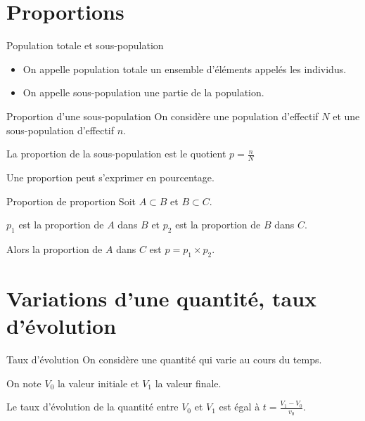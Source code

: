 \begin{pageCours} %


\section{Proportions}

\begin{DefT}{Population totale et sous-population}
\begin{itemize}
\item On appelle population totale un ensemble d'éléments appelés les individus.
\item On appelle sous-population une partie de la population.
\end{itemize}
\end{DefT}

\begin{DefT}{Proportion d'une sous-population}
On considère une population d'effectif $N$ et une sous-population d'effectif $n$.

La proportion de la sous-population est le quotient $p=\frac{n}{N}$
\end{DefT}

\begin{Rq}
Une proportion peut s'exprimer en pourcentage.
\end{Rq}

\begin{PpT}{Proportion de proportion}
Soit $A\subset B$ et $B\subset C$.

$p_1$ est la proportion de $A$ dans $B$ et $p_2$ est la proportion de $B$ dans $C$. 

Alors la proportion de $A$ dans $C$ est $p=p_1\times p_2$.
\end{PpT}

\section{Variations d'une quantité, taux d'évolution}

\begin{DefT}{Taux d'évolution}
On considère une quantité qui varie au cours du temps.

On note $V_0$ la valeur initiale et $V_1$ la valeur finale.

Le taux d'évolution de la quantité entre $V_0$ et $V_1$ est égal à $t=\frac{V_1-V_0}{v_0}$.
\end{DefT}
\end{pageCours}
